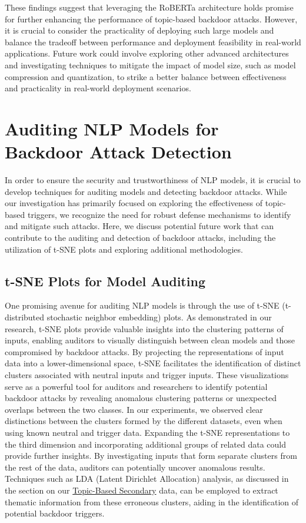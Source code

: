 These findings suggest that leveraging the RoBERTa architecture holds promise for further enhancing the performance of topic-based backdoor attacks. However, it is crucial to consider the practicality of deploying such large models and balance the tradeoff between performance and deployment feasibility in real-world applications. Future work could involve exploring other advanced architectures and investigating techniques to mitigate the impact of model size, such as model compression and quantization, to strike a better balance between effectiveness and practicality in real-world deployment scenarios.

\section{Auditing NLP Models for Backdoor Attack Detection}

In order to ensure the security and trustworthiness of NLP models, it is crucial to develop techniques for auditing models and detecting backdoor attacks. While our investigation has primarily focused on exploring the effectiveness of topic-based triggers, we recognize the need for robust defense mechanisms to identify and mitigate such attacks. Here, we discuss potential future work that can contribute to the auditing and detection of backdoor attacks, including the utilization of t-SNE plots and exploring additional methodologies.

\subsection{t-SNE Plots for Model Auditing}

One promising avenue for auditing NLP models is through the use of t-SNE (t-distributed stochastic neighbor embedding) plots. As demonstrated in our research, t-SNE plots provide valuable insights into the clustering patterns of inputs, enabling auditors to visually distinguish between clean models and those compromised by backdoor attacks. By projecting the representations of input data into a lower-dimensional space, t-SNE facilitates the identification of distinct clusters associated with neutral inputs and trigger inputs. These visualizations serve as a powerful tool for auditors and researchers to identify potential backdoor attacks by revealing anomalous clustering patterns or unexpected overlaps between the two classes. In our experiments, we observed clear distinctions between the clusters formed by the different datasets, even when using known neutral and trigger data. Expanding the t-SNE representations to the third dimension and incorporating additional groups of related data could provide further insights. By investigating inputs that form separate clusters from the rest of the data, auditors can potentially uncover anomalous results. Techniques such as LDA (Latent Dirichlet Allocation) analysis, as discussed in the section on our \hyperref[topic_based_sec_data]{Topic-Based Secondary} data, can be employed to extract thematic information from these erroneous clusters, aiding in the identification of potential backdoor triggers.

